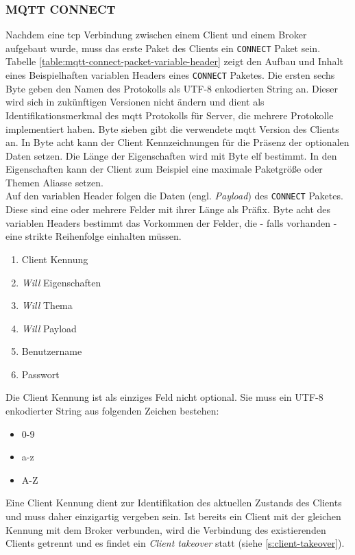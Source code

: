 \subsubsection{MQTT CONNECT} \label{s:mqtt-connect}
Nachdem eine \ac{tcp} Verbindung zwischen einem Client und einem Broker aufgebaut wurde, muss das erste Paket des Clients ein \verb|CONNECT| Paket sein.
Tabelle \ref{table:mqtt-connect-packet-variable-header} zeigt den Aufbau und Inhalt eines Beispielhaften variablen Headers eines \verb|CONNECT| Paketes.
Die ersten sechs Byte geben den Namen des Protokolls als UTF-8 enkodierten String an. Dieser wird sich in zukünftigen Versionen nicht ändern und dient als Identifikationsmerkmal des \ac{mqtt} Protokolls für Server, die mehrere Protokolle implementiert haben. Byte sieben gibt die verwendete \ac{mqtt} Version des Clients an. In Byte acht kann der Client Kennzeichnungen für die Präsenz der optionalen Daten setzen. Die Länge der Eigenschaften wird mit Byte elf bestimmt. In den Eigenschaften kann der Client zum Beispiel eine maximale Paketgrö{\ss}e oder Themen Aliasse setzen.\cite{mqtt5Specification}\\
Auf den variablen Header folgen die Daten (engl. \textit{Payload}) des \verb|CONNECT| Paketes. Diese sind eine oder mehrere Felder mit ihrer Länge als Präfix. Byte acht des variablen Headers bestimmt das Vorkommen der Felder, die - falls vorhanden - eine strikte Reihenfolge einhalten müssen.
\begin{enumerate}
    \item Client Kennung
    \item \textit{Will} Eigenschaften
    \item \textit{Will} Thema
    \item \textit{Will} Payload
    \item Benutzername
    \item Passwort
\end{enumerate}
Die Client Kennung ist als einziges Feld nicht optional. Sie muss ein UTF-8 enkodierter String aus folgenden Zeichen bestehen:
\begin{itemize}
    \item 0-9
    \item a-z
    \item A-Z
\end{itemize}
Eine Client Kennung dient zur Identifikation des aktuellen Zustands des Clients und muss daher einzigartig vergeben sein. Ist bereits ein Client mit der gleichen Kennung mit dem Broker verbunden, wird die Verbindung des existierenden Clients getrennt und es findet ein \textit{Client takeover} statt (siehe \ref{s:client-takeover}).\cite{mqtt5Specification}
